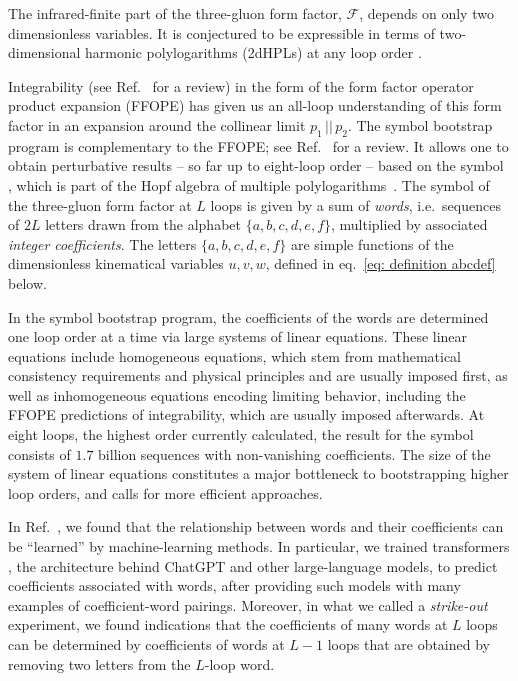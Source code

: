 \documentclass[12pt]{article}
\begin{document}
The infrared-finite part of the three-gluon form factor, $\mathcal{F}$,  depends on only two dimensionless variables. It is conjectured to be expressible in terms of two-dimensional harmonic polylogarithms (2dHPLs) \citep{Gehrmann:2000zt} at any loop order \citep{Dixon:2020bbt,Dixon:2022rse}. 

Integrability (see Ref.~\citep{Beisert:2010jr} for a review) in the form of the form factor operator product expansion (FFOPE) \citep{Basso:2013vsa,Sever:2020jjx,Sever:2021nsq,Sever:2021xga} has given us an all-loop understanding of this form factor in an expansion around the collinear limit $p_1\,||\,p_2$.
The symbol bootstrap program \citep{Dixon:2011pw, Caron-Huot:2016owq,Caron-Huot:2019vjl} is complementary to the FFOPE; see Ref.~\citep{Caron-Huot:2020bkp} for a review. It allows one to obtain perturbative results -- so far up to eight-loop order \citep{Dixon:2020bbt,Dixon:2022rse} -- based on the symbol \citep{Goncharov:2010jf}, which is part of the Hopf algebra of multiple polylogarithms~\citep{Goncharov:2001iea}.
The symbol of the three-gluon form factor at $L$ loops is given by a sum of \emph{words}, i.e.\ sequences of $2L$ letters drawn from the alphabet $\{a,b,c,d,e,f\}$, multiplied by associated \emph{integer coefficients}.  The letters $\{a,b,c,d,e,f\}$ are simple functions of the dimensionless kinematical variables $u,v,w$, defined in eq.~\eqref{eq: definition abcdef} below.

In the symbol bootstrap program, the coefficients of the words are determined one loop order at a time via large systems of linear equations. These linear equations include homogeneous equations, which stem from mathematical consistency requirements and physical principles and are usually imposed first, as well as inhomogeneous equations encoding limiting behavior, including the FFOPE predictions of integrability, which are usually imposed afterwards.  At eight loops, the highest order currently calculated, the result for the symbol consists of $1.7$ billion sequences with non-vanishing coefficients.  The size of the system of linear equations constitutes a major bottleneck to bootstrapping higher loop orders, and calls for more efficient approaches.
    
In Ref.~\citep{Cai:2024znx}, we found that the relationship between words and their coefficients can be ``learned'' by machine-learning methods. In particular, we trained transformers \citep{Vaswani:2017lxt}, the architecture behind ChatGPT and other large-language models, to predict coefficients associated with words, after providing such models with many examples of coefficient-word pairings. Moreover, in what we called a \emph{strike-out} experiment, we found indications that the coefficients of many words at $L$ loops can be determined by coefficients of words at $L-1$ loops that are obtained by removing two letters from the $L$-loop word. 
\end{document}
